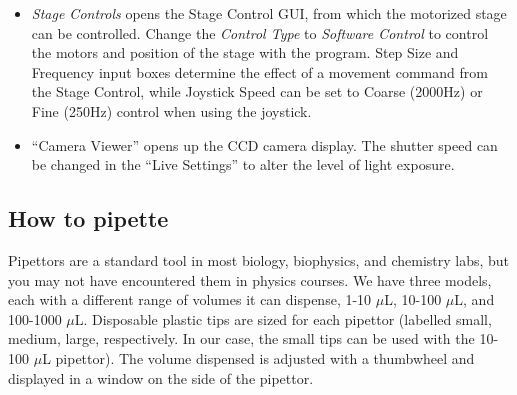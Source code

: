 \documentclass{../lab}
\begin{document}
\begin{itemize}
    \item \emph{Stage Controls} opens the Stage Control GUI, from which the motorized stage can be controlled. Change the \emph{Control Type} to \emph{Software Control} to control the motors and position of the stage with the program. Step Size and Frequency input boxes determine the effect of a movement command from the Stage Control, while Joystick Speed can be set to Coarse (2000Hz) or Fine (250Hz) control when using the joystick.

    \item ``Camera Viewer'' opens up the CCD camera display. The shutter speed can be changed in the ``Live Settings'' to alter the level of light exposure.
\end{itemize}

\subsection{How to pipette}

Pipettors are a standard tool in most biology, biophysics, and chemistry labs, but you may not have encountered them in physics courses. We have three models, each with a different range of volumes it can dispense, 1-10 $\mu$L, 10-100 $\mu$L, and 100-1000 $\mu$L. Disposable plastic tips are sized for each pipettor (labelled small, medium, large, respectively. In our case, the small tips can be used with the 10-100 $\mu$L pipettor). The volume dispensed is adjusted with a thumbwheel and displayed in a window on the side of the pipettor.
\end{document}
